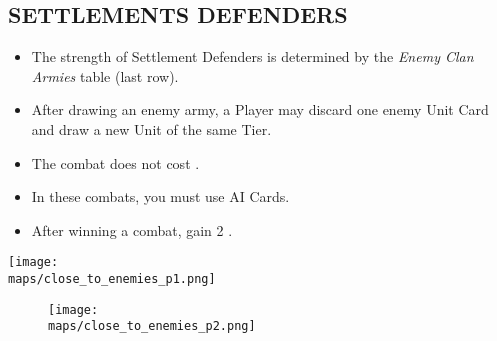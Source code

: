 \begin{multicols}{2}
\subsection*{\MakeUppercase{Settlements Defenders}}
\begin{itemize}
  \item The strength of Settlement Defenders is determined by the \textit{Enemy Clan Armies} table (last row).
  \item After drawing an enemy army, a Player may discard one enemy Unit Card and draw a new Unit of the same Tier.
  \item The combat does not cost .
  \item In these combats, you must use AI Cards.
  \item After winning a combat, gain 2 .
\end{itemize}
\columnbreak

\vspace*{\fill}
\begin{center}
  \texttt{[image: \\maps/close\_to\_enemies\_p1.png]}
\end{center}
\vspace*{\fill}

\end{multicols}

\begin{figure}[h!]
  \centering
  \texttt{[image: \\maps/close\_to\_enemies\_p2.png]}
\end{figure}

